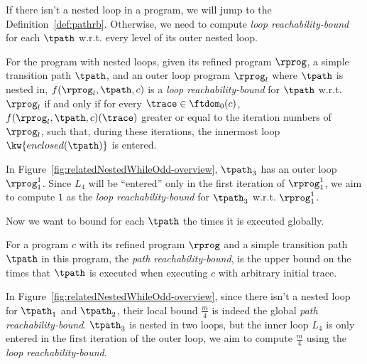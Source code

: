 If there isn't a nested loop in a program, we will jump to the Definition~\ref{def:pathrb}.
Otherwise, we need to compute \emph{loop reachability-bound}
for each $\tpath$ w.r.t. every level of its outer nested loop.
\begin{defn}
For the program with nested loops, given its refined program $\rprog$, a simple transition path $\tpath$, and an outer loop
program $\rprog_l$ where $\tpath$ is nested in,
$f(\rprog_l, \tpath, c)$ is a \emph{loop reachability-bound} for $\tpath$ w.r.t. $\rprog_l$ if and only if
for every $\trace \in \ftdom_0(c)$, $f(\rprog_l, \tpath, c)(\trace)$ greater or equal to the
iteration numbers of $\rprog_l$,
such that,
during these iterations, the innermost loop $\kw{enclosed(\tpath)}$ is entered.
\end{defn}
In Figure~\ref{fig:relatedNestedWhileOdd-overview}, $\tpath_3$ has an outer loop $\rprog_1^1$. Since $L_4$ will be ``entered'' only in the first iteration of $\rprog_1^1$,
we aim to compute $1$ as the \emph{loop reachability-bound} for $\tpath_3$ w.r.t. $\rprog_1^1$.

Now we want to bound for each $\tpath$ the times it is executed globally.
\begin{defn}
For a program $c$ with its refined program $\rprog$ and a simple transition path $\tpath$ in this program, 
the \emph{path reachability-bound},
is the upper bound on the
times that $\tpath$ is executed when executing $c$ with arbitrary initial trace.
\end{defn}
%
In Figure~\ref{fig:relatedNestedWhileOdd-overview}, since there isn't a nested loop for $\tpath_1$ and $\tpath_2$, their local bound $\frac{m}{4}$ is indeed the global \emph{path reachability-bound}.
$\tpath_3$ is nested in two loops, but the inner loop $L_4$ is only entered in the first iteration of the outer loop, we aim to compute $\frac{m}{4}$ using the \emph{loop reachability-bound}.

